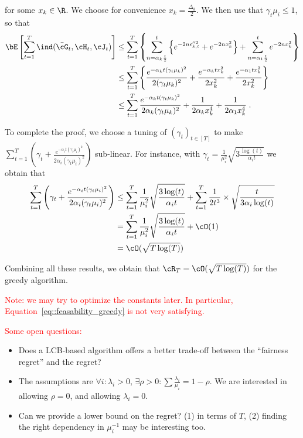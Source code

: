 for some $x_k\in \R$. We choose for convenience $x_k=\frac{\Delta_k}{2}$. We then use that $\gamma_t \mu_i \leq 1$, so that 
\begin{align*}
\bE\left[\sum_{t=1}^T \ind(\bar \cG_t, \cH_t, \cJ_t)\right] &\leq \sum_{t=1}^T \left\{\sum_{n=\alpha_k\frac{t}{2}}^t \left\{e^{-2 n \epsilon_{k,t}''^2}+ e^{-2 n x_k^2}\right\} + \sum_{n=\alpha_1 \frac{t}{2}}^t e^{-2 n x_k^2} \right\} \\
& \leq \sum_{t=1}^T \left\{\frac{e^{-\alpha_k t (\gamma_t \mu_k)^2}}{2 (\gamma_t \mu_k)^2} + \frac{e^{-\alpha_k t x_k^2}}{2 x_k^2} + \frac{e^{-\alpha_1 t x_k^2}}{2 x_k^2}  \right\}  \\
& \leq \sum_{t=1}^T \frac{e^{-\alpha_k t (\gamma_t \mu_k)^2}}{2\alpha_k (\gamma_t \mu_k)^2} + \frac{1}{2\alpha_k x_k^4} + \frac{1}{2\alpha_1 x_k^4} \;.
\end{align*}

To complete the proof, we choose a tuning of $(\gamma_t)_{t\in[T]}$ to make $\sum_{t=1}^T \left(\gamma_t + \frac{e^{-\alpha_i t (\gamma_t \mu_i)^2}}{2\alpha_i (\gamma_t \mu_i)^2}\right)$ sub-linear. For instance, with $\gamma_t=\frac{1}{\mu_i^2}\sqrt{3\frac{\log(t)}{\alpha_i t}}$ we obtain that 
\begin{align*}\sum_{t=1}^T \left(\gamma_t + \frac{e^{-\alpha_i t (\gamma_t \mu_i)^2}}{2\alpha_i (\gamma_t \mu_i)^2}\right) & \leq \sum_{t=1}^T\frac{1}{\mu_i^2}\sqrt{\frac{3\log(t)}{\alpha_i t}} + \sum_{t=1}^T \frac{1}{2 t^3}\times \sqrt{\frac{t}{3\alpha_i\log(t)}} \\
& = \sum_{t=1}^T\frac{1}{\mu_i^2}\sqrt{\frac{3\log(t)}{\alpha_i t}} + \cO(1)  \\
& = \cO(\sqrt{T\log(T)})
\end{align*}

Combining all these results, we obtain that $\cR_T = \cO(\sqrt{T\log(T)})$ for the greedy algorithm. 

\textcolor{red}{Note: we may try to optimize the constants later. In particular, Equation~\eqref{eq::feasability_greedy} is not very satisfying.}


\textcolor{red}{Some open questions:}

\begin{itemize}
	\item Does a LCB-based algorithm offers a better trade-off between the ``fairness regret'' and the regret? 
	\item The assumptions are $\forall i: \lambda_i>0$, $\exists \rho>0: \sum \frac{\lambda_i}{\mu_i}=1-\rho$. We are interested in allowing $\rho=0$, and allowing $\lambda_i=0$.
	\item Can we provide a lower bound on the regret? (1) in terms of $T$, (2) finding the right dependency in $\mu_i^{-1}$ may be interesting too. 
\end{itemize}

